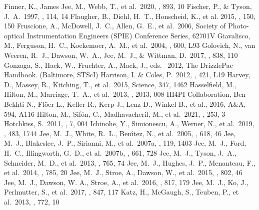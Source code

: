 \documentclass[twocolumn]{aastex631}
\begin{document}
\begin{thebibliography}{}
 Finner, K., James Jee, M., Webb, T., et al.\ 2020, \apj, 893, 10
 Fischer, P., \& Tyson, J.~A.\ 1997, \aj, 114, 14
 Flaugher, B., Diehl, H.~T., Honscheid, K., et al. 2015, \aj, 150, 150
 Fruscione, A., McDowell, J.~C., Allen, G.~E., et al.\ 2006, Society of Photo-optical Instrumentation Engineers (SPIE) Conference Series, 62701V
 Giavalisco, M., Ferguson, H.~C., Koekemoer, A.~M., et al.\ 2004, \apjl, 600, L93
 Golovich, N., van Weeren, R.~J., Dawson, W.~A., Jee, M.~J., \& Wittman, D.\ 2017, \apj, 838, 110 
 Gonzaga, S., Hack, W., Fruchter, A., Mack, J., eds. \ 2012, The DrizzlePac Handbook. (Baltimore, STScI)
 Harrison, I. \& Coles, P.\ 2012, \mnras, 421, L19
 Harvey, D., Massey, R., Kitching, T., et al.\ 2015, Science, 347, 1462
 Hasselfield, M., Hilton, M., Marriage, T.~A., et al.\ 2013, \jcap, 2013, 008
 HI4PI Collaboration, Ben Bekhti N., Fl\"{o}er L., Keller R., Kerp J., Lenz D., Winkel B., et al., 2016, A\&A, 594, A116
 Hilton, M., {Sif{\'o}n}, C., {Madhavacheril}, M., et al.\ 2021, \apjs, 253, 3
 Hotchkiss, S.\ 2011, \jcap, 7, 004
 Ichinohe, Y., Simionescu, A., Werner, N., et al.\ 2019, \mnras, 483, 1744
 Jee, M.~J., White, R.~L., Ben{\'{\i}}tez, N., et al.\ 2005, \apj, 618, 46
 Jee, M.~J., Blakeslee, J.~P., Sirianni, M., et al.\ 2007a, \pasp, 119, 1403
 Jee, M.~J., Ford, H.~C., Illingworth, G.~D., et al.\ 2007b, \apj, 661, 728
 Jee, M.~J., Tyson, J.~A., Schneider, M.~D., et al.\ 2013, \apj, 765, 74
 Jee, M.~J., Hughes, J.~P., Menanteau, F., et al.\ 2014, \apj, 785, 20 
 Jee, M.~J., Stroe, A., Dawson, W., et al.\ 2015, \apj, 802, 46
 Jee, M.~J., Dawson, W. A., Stroe, A., et al.\ 2016, \apj, 817, 179
 Jee, M.~J., Ko, J., Perlmutter, S., et al.\ 2017, \apj, 847, 117 
 Katz, H., McGaugh, S., Teuben, P., et al.\ 2013, \apj, 772, 10

\end{thebibliography}
\end{document}

